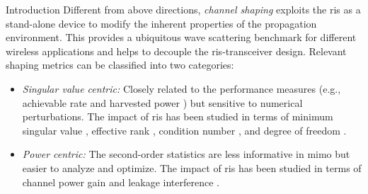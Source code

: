 \begin{section}{Introduction}
	Different from above directions, \emph{channel shaping} exploits the \gls{ris} as a stand-alone device to modify the inherent properties of the propagation environment.
	This provides a ubiquitous wave scattering benchmark for different wireless applications and helps to decouple the \gls{ris}-transceiver design.
	Relevant shaping metrics can be classified into two categories:
	\begin{itemize}
		\item \emph{Singular value centric:} Closely related to the performance measures (e.g., achievable rate and harvested power \cite{Shen2021}) but sensitive to numerical perturbations. The impact of \gls{ris} has been studied in terms of minimum singular value \cite{ElMossallamy2021}, effective rank \cite{ElMossallamy2021,Meng2023}, condition number \cite{Zheng2022,Huang2023}, and degree of freedom \cite{Bafghi2022,Zheng2023,Chae2023}.
		\item \emph{Power centric:} The second-order statistics are less informative in \gls{mimo} but easier to analyze and optimize. The impact of \gls{ris} has been studied in terms of channel power gain \cite{Wu2019,Shen2020a,Nerini2023,Nerini2024,Santamaria2023} and leakage interference \cite{Santamaria2023a}.
	\end{itemize}


\end{section}
